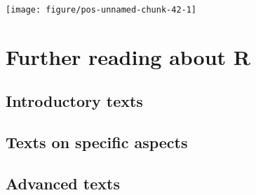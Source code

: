 \documentclass[paper=a4,10pt,div=17,headsepline,BCOR=12mm,twoside,open=right]{scrbook}\usepackage{knitr}
\begin{document}
\begin{knitrout}\footnotesize
{}\color{fgcolor}\begin{kframe}
\begin{alltt}
  \hlopt{+}
  \hlstd{(}\hlstd{=}\hlstd{,} \hlstd{=}\hlstd{,} \hlstd{=}\hlstd{)} \hlopt{+}
  \hlstd{(}\hlstd{=}\hlstd{)} \hlopt{+}
  \hlstd{(}  \hlopt{~}   \hlstd{=} \hlopt{-}\hlstd{,}  \hlstd{=} \hlstd{)} \hlopt{+}
  \hlstd{(}\hlopt{~} \hlstd{=}\hlstd{)} \hlopt{+}
  \hlstd{(}\hlstd{)}
\end{alltt}
\end{kframe}

{\centering \texttt{[image: figure/pos-unnamed-chunk-42-1]} 

}



\end{knitrout}

\begin{knitrout}\footnotesize
{}\color{fgcolor}\begin{kframe}
\begin{alltt}
\hlstd{(}\hlopt{:}
\hlstd{(}\hlopt{:}
\hlstd{(}\hlopt{:}
\end{alltt}
\end{kframe}
\end{knitrout}





\chapter{Further reading about R}\label{chap:R:readings}

\section{Introductory texts}

\nocite{Dalgaard2008,Zuur2009,Teetor2011}

\section{Texts on specific aspects}

\nocite{Chang2013,Fox2002,Fox2010,Faraway2004,Faraway2006,Everitt2011}

\section{Advanced texts}

\nocite{Xie2013,wickham2015,wickham2014advanced,Pinheiro2000,Murrell2011,Matloff2011,Ihaka1996}

\printbibliography
\end{document}
